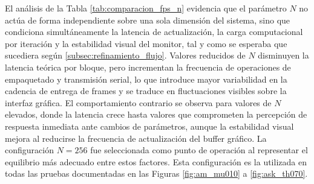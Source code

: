 \begin{table}[H]
\centering
\caption{Comportamiento del sistema bajo distintos tamaños de bloque $N$ ($F_s = 5000\,\text{Hz}$), considerando cinco ejecuciones continuas independientes por cada valor evaluado.}
\label{tab:comparacion_fps_n}
\end{table}

El análisis de la Tabla \ref{tab:comparacion_fps_n} evidencia que el parámetro $N$ no actúa de forma independiente sobre una sola dimensión del sistema, sino que condiciona simultáneamente la latencia de actualización, la carga computacional por iteración y la estabilidad visual del monitor, tal y como se esperaba que sucediera según \ref{subsec:refinamiento_flujo}. Valores reducidos de $N$ disminuyen la latencia teórica por bloque, pero incrementan la frecuencia de operaciones de empaquetado y transmisión serial, lo que introduce mayor variabilidad en la cadencia de entrega de frames y se traduce en fluctuaciones visibles sobre la interfaz gráfica. El comportamiento contrario se observa para valores de $N$ elevados, donde la latencia crece hasta valores que comprometen la percepción de respuesta inmediata ante cambios de parámetros, aunque la estabilidad visual mejora al reducirse la frecuencia de actualización del buffer gráfico. La configuración $N = 256$ fue seleccionada como punto de operación al representar el equilibrio más adecuado entre estos factores. Esta configuración es la utilizada en todas las pruebas documentadas en las Figuras \ref{fig:am_mu010} a \ref{fig:ask_th070}.

